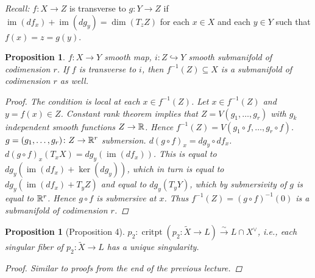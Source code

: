\documentclass[A4paper, british]{amsart}
\theoremstyle{darkgreentheorem}
\newtheorem{prop}[thm]{Proposition}
\theoremstyle{darkbluedefinition}
\theoremstyle{darkredexample}
\theoremstyle{remark}
\DeclareMathOperator{\im}{im}
\newcommand{\1}{\mathbbm{1}}
\newcommand{\dual}{^{\vee}}
\newcommand{\sub}{\subseteq}
\newcommand{\mono}{\hookrightarrow}
\begin{document}
\textit{Recall:} $f\colon X\to Z$ is transverse to $g\colon Y\to Z$ if $\im(df_{x})+\im(dg_{y})=\dim(T_{z}Z)$ for each $x\in X$ and each $y\in Y$ such that $f(x)=z=g(y)$.

\begin{prop}
    $f\colon X\to Y$ smooth map, $i\colon Z\mono Y$ smooth submanifold of codimension $r$.
    If $f$ is transverse to $i$, then $f^{-1}(Z)\sub X$ is a submanifold of codimension $r$ as well.
    \begin{proof}
	The condition is local at each $x\in f^{-1}(Z)$.
	Let $x\in f^{-1}(Z)$ and $y=f(x)\in Z$.
	Constant rank theorem implies that $Z=V(g_{1},\ldots,g_{r})$ with $g_{k}$ independent smooth functions $Z\to \mathbb{R}$.
	Hence $f^{-1}(Z)=V(g_{1}\circ f,\ldots,g_{r}\circ f)$.
	$g=(g_{1},\ldots,g_{r})\colon Z\to \mathbb{R}^{r}$ submersion.
	$d(g\circ f)_{x}=dg_{y} \circ df_{x}$.
	$d(g\circ f)_{x}(T_{x}X)=dg_{y}(\im(df_{x}))$.
	This is equal to $dg_{y}(\im(df_{x})+\ker(dg_{y}))$, which in turn is equal to $dg_{y}(\im(df_{x})+T_{y}Z)$ and equal to $dg_{y}(T_{y}Y)$, which by submersivity of $g$ is equal to $\mathbb{R}^{r}$.
	Hence $g\circ f$ is submersive at $x$.
	Thus $f^{-1}(Z)=(g\circ f)^{-1}(0)$ is a submanifold of codimension $r$.
    \end{proof}
\end{prop}

\begin{prop}[Proposition 4]
    $p_{2}\colon \operatorname{critpt}(p_{2}\colon \tilde{X}\to L)\xrightarrow{\sim}L\cap X\dual$, i.e., each singular fiber of $p_{2}\colon \tilde{X}\to L$ has a unique singularity.
    \begin{proof}
	Similar to proofs from the end of the previous lecture.
    \end{proof}
\end{prop}
\end{document}
